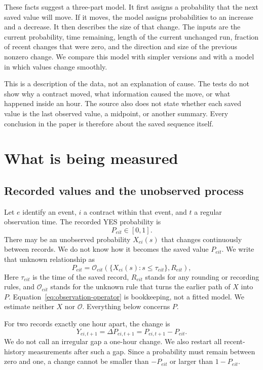 \documentclass[10pt,twoside]{article}
\begin{document}
These facts suggest a three-part model. It first assigns a probability that the next saved value will move. If it moves, the model assigns probabilities to an increase and a decrease. It then describes the size of that change. The inputs are the current probability, time remaining, length of the current unchanged run, fraction of recent changes that were zero, and the direction and size of the previous nonzero change. We compare this model with simpler versions and with a model in which values change smoothly.

This is a description of the data, not an explanation of cause. The tests do not show why a contract moved, what information caused the move, or what happened inside an hour. The source also does not state whether each saved value is the last observed value, a midpoint, or another summary. Every conclusion in the paper is therefore about the saved sequence itself.

\section{What is being measured}

\subsection{Recorded values and the unobserved process}

Let $e$ identify an event, $i$ a contract within that event, and $t$ a regular observation time. The recorded YES probability is
\begin{equation}
  P_{e i t}\in[0,1].
  \label{eq:recorded-probability}
\end{equation}
There may be an unobserved probability $X_{e i}(s)$ that changes continuously between records. We do not know how it becomes the saved value $P_{e i t}$. We write that unknown relationship as
\begin{equation}
  P_{e i t}
  =\mathcal O_{e i t}\!\left(\{X_{e i}(s):s\le \tau_{e i t}\},R_{e i t}\right),
  \label{eq:observation-operator}
\end{equation}
Here $\tau_{e i t}$ is the time of the saved record, $R_{e i t}$ stands for any rounding or recording rules, and $\mathcal O_{e i t}$ stands for the unknown rule that turns the earlier path of $X$ into $P$. Equation~\eqref{eq:observation-operator} is bookkeeping, not a fitted model. We estimate neither $X$ nor $\mathcal O$. Everything below concerns $P$.

For two records exactly one hour apart, the change is
\begin{equation}
  Y_{e i,t+1}=\Delta P_{e i,t+1}=P_{e i,t+1}-P_{e i t}.
  \label{eq:increment}
\end{equation}
We do not call an irregular gap a one-hour change. We also restart all recent-history measurements after such a gap. Since a probability must remain between zero and one, a change cannot be smaller than $-P_{e i t}$ or larger than $1-P_{e i t}$.
\end{document}
